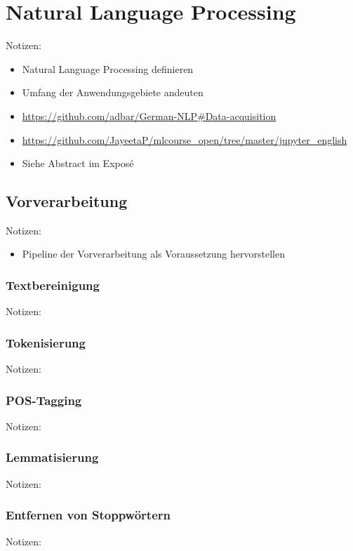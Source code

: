 \chapter{Natural Language Processing}
\thispagestyle{fancy}
\label{chap:Natural Language Processing}

Notizen:
\begin{itemize}
	\item Natural Language Processing definieren
	\item Umfang der Anwendungsgebiete andeuten
	\item \url{https://github.com/adbar/German-NLP#Data-acquisition}
	\item \url{https://github.com/JayeetaP/mlcourse_open/tree/master/jupyter_english}
	\item Siehe Abstract im Exposé
\end{itemize}


\section{Vorverarbeitung}
Notizen:
\begin{itemize}
	\item Pipeline der Vorverarbeitung als Voraussetzung hervorstellen
\end{itemize}


\subsection{Textbereinigung}
Notizen:


\subsection{Tokenisierung}
Notizen:


\subsection{POS-Tagging}
Notizen:


\subsection{Lemmatisierung}
Notizen:


\subsection{Entfernen von Stoppwörtern}
Notizen:


